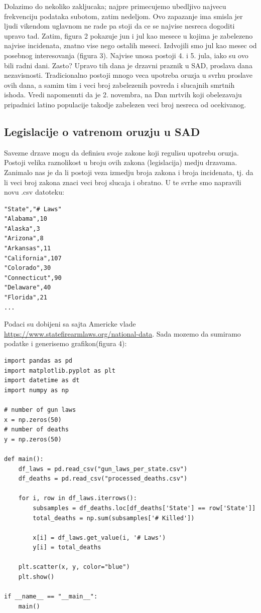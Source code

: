 \documentclass[11pt]{article} %
\begin{document}
Dolazimo do nekoliko zakljucaka; najpre primecujemo ubedljivo najvecu frekvenciju podataka subotom, zatim nedeljom. 
Ovo zapazanje ima smisla jer ljudi vikendom uglavnom ne rade pa stoji da ce se najvise nesreca dogoditi upravo tad.
Zatim, figura 2 pokazuje jun i jul kao mesece u kojima je zabelezeno najvise incidenata, znatno vise nego ostalih 
meseci. Izdvojili smo jul kao mesec od posebnog interesovanja (figura 3). Najvise unosa postoji 4. i 5. jula, iako 
su ovo bili radni dani. Zasto? Upravo tih dana je drzavni praznik u SAD, proslava dana nezavisnosti. Tradicionalno
postoji mnogo veca upotreba oruzja u svrhu proslave ovih dana, a samim tim i veci broj zabelezenih povreda i slucajnih 
smrtnih ishoda. Vredi napomenuti da je 2. novembra, na Dan mrtvih koji obelezavaju pripadnici latino populacije takodje
zabelezen veci broj nesreca od ocekivanog.
\subsection{Legislacije o vatrenom oruzju u SAD}
Savezne drzave mogu da definisu svoje zakone koji regulisu upotrebu oruzja. Postoji velika raznolikost u broju ovih zakona (legislacija)
medju drzavama. Zanimalo nas je da li postoji veza izmedju broja zakona i broja incidenata, tj. da li veci broj zakona znaci veci broj slucaja 
i obratno. U te svrhe smo napravili novu .csv datoteku:
\begin{lstlisting}[caption={gun\_laws\_per\_state.csv}]
"State","# Laws"
"Alabama",10
"Alaska",3
"Arizona",8
"Arkansas",11
"California",107
"Colorado",30
"Connecticut",90
"Delaware",40
"Florida",21
...
\end{lstlisting}
Podaci su dobijeni sa sajta Americke vlade \url{https://www.statefirearmlaws.org/national-data}. Sada mozemo da sumiramo
podatke i generisemo grafikon(figura 4):
\begin{lstlisting}[caption={processing\_gun\_laws.py}]
import pandas as pd
import matplotlib.pyplot as plt
import datetime as dt
import numpy as np

# number of gun laws
x = np.zeros(50)
# number of deaths
y = np.zeros(50)

def main():
	df_laws = pd.read_csv("gun_laws_per_state.csv")
	df_deaths = pd.read_csv("processed_deaths.csv")

	for i, row in df_laws.iterrows():
		subsamples = df_deaths.loc[df_deaths['State'] == row['State']]
		total_deaths = np.sum(subsamples['# Killed'])

		x[i] = df_laws.get_value(i, '# Laws')
		y[i] = total_deaths

	plt.scatter(x, y, color="blue")
	plt.show()

if __name__ == "__main__":
	main()
\end{lstlisting}
\end{document}
